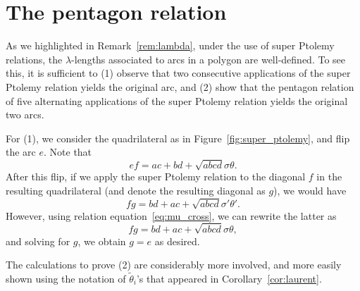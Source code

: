 \appendix
\section{The pentagon relation} \label{appendix}

As we highlighted in Remark~\ref{rem:lambda}, under the use of super Ptolemy relations, the $\lambda$-lengths associated to arcs in a polygon are well-defined. To see this, it is sufficient to (1) observe that two consecutive applications of the super Ptolemy relation yields the original arc, and (2) show that the pentagon relation of five alternating applications of the super Ptolemy relation yields the original two arcs.

For (1), we consider the quadrilateral as in Figure~\ref{fig:super_ptolemy}, and flip the arc $e$.
Note that \[ef = ac + bd + \sqrt{abcd} \sigma \theta.\]
After this flip, if we apply the super Ptolemy relation to the diagonal $f$ in the resulting quadrilateral (and denote the resulting diagonal as $g$), we would have
\[fg = bd + ac + \sqrt{abcd} \sigma' \theta'.\]
However, using relation equation~\eqref{eq:mu_cross}, we can rewrite the latter as
\[fg = bd + ac + \sqrt{abcd} \sigma \theta,\] and solving for $g$, we obtain $g = e$ as desired.

The calculations to prove (2) are considerably more involved, and more easily shown using the notation of $\widetilde{\theta}_i$'s
that appeared in Corollary~\ref{cor:laurent}.

